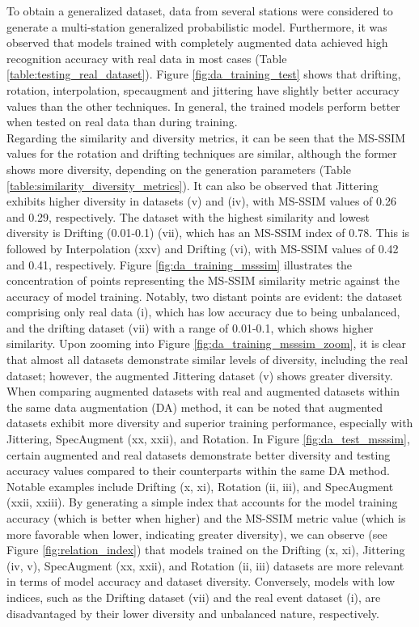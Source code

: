 \documentclass[journal]{IEEEtran}
\begin{document}
To obtain a generalized dataset, data from several stations were considered to generate a multi-station generalized probabilistic model. Furthermore, it was observed that models trained with completely augmented data achieved high recognition accuracy with real data in most cases (Table \ref{table:testing_real_dataset}).
Figure \ref{fig:da_training_test} shows that drifting, rotation, interpolation, specaugment and jittering have slightly better accuracy values than the other techniques. In general, the trained models perform better when tested on real data than during training. \\
Regarding the similarity and diversity metrics, it can be seen that the MS-SSIM values for the rotation and drifting techniques are similar, although the former shows more diversity, depending on the generation parameters (Table \ref{table:similarity_diversity_metrics}).
It can also be observed that Jittering exhibits higher diversity in datasets (v) and (iv), with MS-SSIM values of 0.26 and 0.29, respectively.
The dataset with the highest similarity and lowest diversity is Drifting (0.01-0.1) (vii), which has an MS-SSIM index of 0.78. This is followed by Interpolation (xxv) and Drifting (vi), with MS-SSIM values of 0.42 and 0.41, respectively.
Figure \ref{fig:da_training_msssim} illustrates the concentration of points representing the MS-SSIM similarity metric against the accuracy of model training. Notably, two distant points are evident: the dataset comprising only real data (i), which has low accuracy due to being unbalanced, and the drifting dataset (vii) with a range of 0.01-0.1, which shows higher similarity. Upon zooming into Figure \ref{fig:da_training_msssim_zoom}, it is clear that almost all datasets demonstrate similar levels of diversity, including the real dataset; however, the augmented Jittering dataset (v) shows greater diversity.
When comparing augmented datasets with real and augmented datasets within the same data augmentation (DA) method, it can be noted that augmented datasets exhibit more diversity and superior training performance, especially with Jittering, SpecAugment (xx, xxii), and Rotation.
In Figure \ref{fig:da_test_msssim}, certain augmented and real datasets demonstrate better diversity and testing accuracy values compared to their counterparts within the same DA method. Notable examples include Drifting (x, xi), Rotation (ii, iii), and SpecAugment (xxii, xxiii).
By generating a simple index that accounts for the model training accuracy (which is better when higher) and the MS-SSIM metric value (which is more favorable when lower, indicating greater diversity), we can observe (see Figure \ref{fig:relation_index}) that models trained on the Drifting (x, xi), Jittering (iv, v), SpecAugment (xx, xxii), and Rotation (ii, iii) datasets are more relevant in terms of model accuracy and dataset diversity. Conversely, models with low indices, such as the Drifting dataset (vii) and the real event dataset (i), are disadvantaged by their lower diversity and unbalanced nature, respectively.
\end{document}
